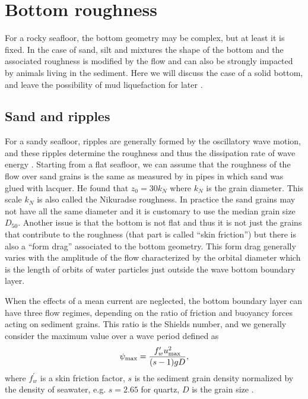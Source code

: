 \section{Bottom roughness}
For a rocky seafloor, the bottom geometry may be complex, but at least it is fixed. In the case of sand, silt and mixtures the shape of the bottom 
and the associated roughness is modified by the flow and can also be strongly impacted by animals living in the sediment. Here we will discuss the case of 
a solid bottom, and leave the possibility of mud liquefaction for later \citep[e.g.][]{Jaramillo&al.2009}.

\subsection{Sand and ripples}
For a sandy seafloor, ripples are generally formed by the oscillatory wave motion, and these ripples determine the roughness and thus the dissipation rate 
of wave energy \citep{Zhukovets1963,Nielsen1992}. Starting from a flat seafloor, we can assume that  the roughness of the flow over sand grains is the same as measured by \cite{Nikuradse1933} 
in pipes in which sand was glued with lacquer. He found that $z_0=30 k_N$ where $k_N$ is the grain diameter. This scale $k_N$ is also called the Nikuradse roughness. In practice the 
sand grains may not have all the same diameter and it is customary to use the median grain size $D_{50}$. Another issue is that the bottom is not flat and thus it is not just the grains that contribute to the 
roughness (that part is called ``skin friction'') but there is also a ``form drag'' associated to the bottom geometry. This form drag generally varies with the amplitude of the flow characterized by the orbital diameter which is the 
length of orbits of water particles just outside the wave bottom boundary layer.

When the effects of a mean current are neglected, the bottom boundary layer can have three flow regimes, depending 
on the ratio of friction and buoyancy forces acting on sediment grains. This ratio is the Shields  number, and we generally 
consider the maximum value over a wave period defined as 
\begin{equation}
\psi _{{\rm max}}=\frac{f_{w}^{\prime }u_{{\rm max}}^{2}}{(s-1)gD},
\label{Shields}
\end{equation}
where $f_{w}^{\prime}$ is a skin friction factor, $s$ is the sediment grain density normalized by the density of seawater, e.g. $s=2.65$ for quartz, 
 $D$ is the grain size  \citep{Shields1936}.

